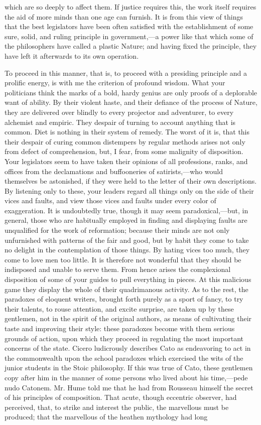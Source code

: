 which are so deeply to affect them. If justice requires this, the work itself requires the aid of more minds than one age can furnish. It is from this view of things that the best legislators have been often satisfied with the establishment of some sure, solid, and ruling principle in government,—a power like that which some of the philosophers have called a plastic Nature; and having fixed the principle, they have left it afterwards to its own operation.

To proceed in this manner, that is, to proceed with a presiding principle and a prolific energy, is with me the criterion of profound wisdom. What your politicians think the marks of a bold, hardy genius are only proofs of a deplorable want of ability. By their violent haste, and their defiance of the process of Nature, they are delivered over blindly to every projector and adventurer, to every alchemist and empiric. They despair of turning to account anything that is common. Diet is nothing in their system of remedy. The worst of it is, that this their despair of curing common distempers by regular methods arises not only from defect of comprehension, but, I fear, from some malignity of disposition. Your legislators seem to have taken their opinions of all professions, ranks, and offices from the declamations and buffooneries of satirists,—who would themselves be astonished, if they were held to the letter of their own descriptions. By listening only to these, your leaders regard all things only on the side of their vices and faults, and view those vices and faults under every color of exaggeration. It is undoubtedly true, though it may seem paradoxical,—but, in general, those who are habitually employed in finding and displaying faults are unqualified for the work of reformation; because their minds are not only unfurnished with patterns of the fair and good, but by habit they come to take no delight in the contemplation of those things. By hating vices too much, they come to love men too little. It is therefore not wonderful that they should be indisposed and unable to serve them. From hence arises the complexional disposition of some of your guides to pull everything in pieces. At this malicious game they display the whole of their quadrimanous activity. As to the rest, the paradoxes of eloquent writers, brought forth purely as a sport of fancy, to try their talents, to rouse attention, and excite surprise, are taken up by these gentlemen, not in the spirit of the original authors, as means of cultivating their taste and improving their style: these paradoxes become with them serious grounds of action, upon which they proceed in regulating the most important concerns of the state. Cicero ludicrously describes Cato as endeavoring to act in the commonwealth upon the school paradoxes which exercised the wits of the junior students in the Stoic philosophy. If this was true of Cato, these gentlemen copy after him in the manner of some persons who lived about his time,—pede nudo Catonem. Mr. Hume told me that he had from Rousseau himself the secret of his principles of composition. That acute, though eccentric observer, had perceived, that, to strike and interest the public, the marvellous must be produced; that the marvellous of the heathen mythology had long 